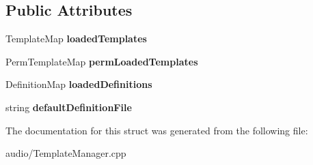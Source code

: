 \subsection*{Public Attributes}
\begin{DoxyCompactItemize}
\item 
Template\+Map {\bfseries loaded\+Templates}\hypertarget{structAudio_1_1____impl_1_1TemplateManagerData_aa5aa59d01b83cd344de4e8f9f89fecbb}{}\label{structAudio_1_1____impl_1_1TemplateManagerData_aa5aa59d01b83cd344de4e8f9f89fecbb}

\item 
Perm\+Template\+Map {\bfseries perm\+Loaded\+Templates}\hypertarget{structAudio_1_1____impl_1_1TemplateManagerData_a891fba6f1ec32aa9b35e9c47cedb50e8}{}\label{structAudio_1_1____impl_1_1TemplateManagerData_a891fba6f1ec32aa9b35e9c47cedb50e8}

\item 
Definition\+Map {\bfseries loaded\+Definitions}\hypertarget{structAudio_1_1____impl_1_1TemplateManagerData_a4d65d2a28f970836033bd41021846551}{}\label{structAudio_1_1____impl_1_1TemplateManagerData_a4d65d2a28f970836033bd41021846551}

\item 
string {\bfseries default\+Definition\+File}\hypertarget{structAudio_1_1____impl_1_1TemplateManagerData_aa700f8fbeb55291ecb6785bf0d092029}{}\label{structAudio_1_1____impl_1_1TemplateManagerData_aa700f8fbeb55291ecb6785bf0d092029}

\end{DoxyCompactItemize}


The documentation for this struct was generated from the following file\+:\begin{DoxyCompactItemize}
\item 
audio/Template\+Manager.\+cpp\end{DoxyCompactItemize}
